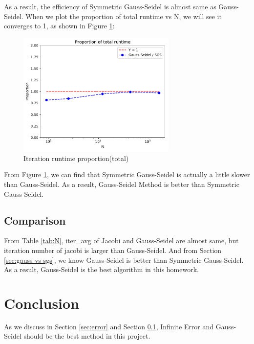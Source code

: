 \documentclass{article}
\begin{document}
As a result, the efficiency of Symmetric Gauss-Seidel is almost same as Gauss-Seidel. When we plot the proportion of total runtime vs N,
we will see it converges to 1, as shown in Figure \ref{fig:gauss vs sgs runtime}:
\begin{figure}[H]
    \centering
    \includegraphics[width=0.7\textwidth]{src/gauss_sgs_runtime.pdf}
    \caption{Iteration runtime proportion(total)}
    \label{fig:gauss vs sgs runtime}
\end{figure}
From Figure \ref{fig:gauss vs sgs runtime}, we can find that Symmetric Gauss-Seidel is actually a little slower than Gauss-Seidel.
As a result, Gauss-Seidel Method is better than Symmetric Gauss-Seidel.

\subsection{Comparison}
\label{sec:comparison}
From Table \ref{tab:N}, iter\_avg of Jacobi and Gauss-Seidel are almost same, but iteration number of jacobi is larger than
Gauss-Seidel. And from Section \ref{sec:gauss vs sgs}, we know Gauss-Seidel is better than Symmetric Gauss-Seidel. As a result, 
Gauss-Seidel is the best algorithm in this homework.


\section{Conclusion}
As we discuss in Section \ref{sec:error} and Section \ref{sec:comparison}, Infinite Error and Gauss-Seidel should be the best 
method in this project.
\end{document}
